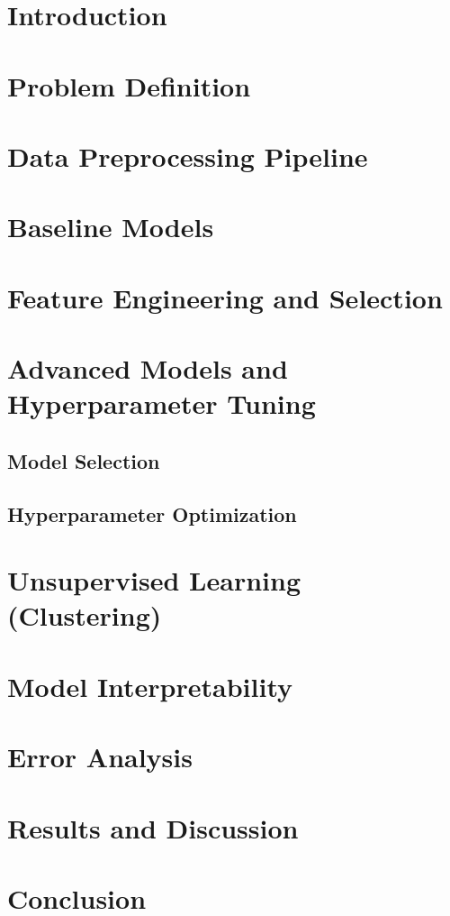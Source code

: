 \documentclass[sigconf]{acmart}
\begin{document}
\section{Introduction}



\section{Problem Definition}



\section{Data Preprocessing Pipeline}


\section{Baseline Models}


\section{Feature Engineering and Selection}

\section{Advanced Models and Hyperparameter Tuning}

\subsection{Model Selection}

\subsection{Hyperparameter Optimization}


\section{Unsupervised Learning (Clustering)}


\section{Model Interpretability}

\section{Error Analysis}

\section{Results and Discussion}

\section{Conclusion}





\end{document}
